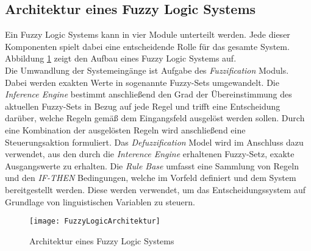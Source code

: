\subsection{Architektur eines Fuzzy Logic Systems}
Ein Fuzzy Logic Systems kann in vier Module unterteilt werden. Jede dieser Komponenten spielt dabei eine entscheidende Rolle für das gesamte System. 
Abbildung \ref{fig:FuzzyLogicArchitektur} zeigt den Aufbau eines Fuzzy Logic Systems auf.\\
Die Umwandlung der Systemeingänge ist Aufgabe des \textit{Fuzzification} Moduls. Dabei werden exakten Werte in sogenannte Fuzzy-Sets umgewandelt. Die \textit{Inference Engine} bestimmt anschließend den Grad der Übereinstimmung des aktuellen Fuzzy-Sets in Bezug auf jede Regel und trifft eine Entscheidung darüber, welche Regeln gemäß dem Eingangsfeld ausgelöst werden sollen. Durch eine Kombination der ausgelösten Regeln wird anschließend eine Steuerungsaktion formuliert. Das \textit{Defuzzification} Model wird im Anschluss dazu verwendet, aus den durch die \textit{Interence Engine} erhaltenen Fuzzy-Setz, exakte Ausgangswerte zu erhalten.
Die \textit{Rule Base} umfasst eine Sammlung von Regeln und den \glqq\textit{IF-THEN}\grqq{} Bedingungen, welche im Vorfeld definiert und dem System bereitgestellt werden. Diese werden verwendet, um das Entscheidungssystem auf Grundlage von linguistischen Variablen zu steuern. \cite{FuzzyLogicGeeks}\\
\vspace{-1.5cm}
\begin{center}
    \begin{figure}[h]
     \centering
     \texttt{[image: FuzzyLogicArchitektur]}
     \caption{Architektur eines Fuzzy Logic Systems \cite{FuzzyLogicGeeks}}
     \label{fig:FuzzyLogicArchitektur}
    \end{figure}
   \end{center}

